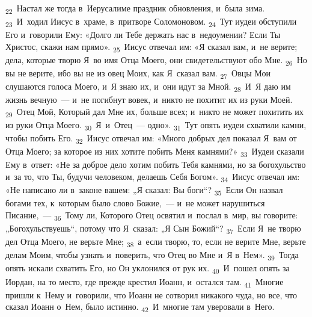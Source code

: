 \documentclass[a4paper,12pt]{article}
\begin{document}
\textsubscript{22}~Настал же тогда в~Иерусалиме праздник обновления, и~была зима. \textsubscript{23}~И~ходил Иисус в~храме, в~притворе Соломоновом. \textsubscript{24}~Тут иудеи обступили Его и~говорили Ему: «Долго ли Тебе держать нас в~недоумении? Если Ты Христос, скажи нам прямо». \textsubscript{25}~Иисус отвечал им: «Я сказал вам, и~не верите; дела, которые творю Я~во имя Отца Моего, они свидетельствуют обо Мне. \textsubscript{26}~Но вы не верите, ибо вы не из овец Моих, как Я~сказал вам. \textsubscript{27}~Овцы Мои слушаются голоса Моего, и~Я знаю их, и~они идут за Мной. \textsubscript{28}~И~Я даю им жизнь вечную~--- и~не погибнут вовек, и~никто не похитит их из руки Моей. \textsubscript{29}~Отец Мой, Который дал Мне их, больше всех; и~никто не может похитить их из руки Отца Моего. \textsubscript{30}~Я~и~Отец~--- одно». \textsubscript{31}~Тут опять иудеи схватили камни, чтобы побить Его. \textsubscript{32}~Иисус отвечал им: «Много добрых дел показал Я~вам от Отца Моего; за которое из них хотите побить Меня камнями?» \textsubscript{33}~Иудеи сказали Ему в~ответ: «Не за доброе дело хотим побить Тебя камнями, но за богохульство и~за то, что Ты, будучи человеком, делаешь Себя Богом». \textsubscript{34}~Иисус отвечал им: «Не написано ли в~законе вашем: „Я сказал: Вы боги“? \textsubscript{35}~Если Он назвал богами тех, к~которым было слово Божие,~--- и~не может нарушиться Писание,~--- \textsubscript{36}~Тому ли, Которого Отец освятил и~послал в~мир, вы говорите: „Богохульствуешь“, потому что Я~сказал: „Я Сын Божий“? \textsubscript{37}~Если Я~не творю дел Отца Моего, не верьте Мне; \textsubscript{38}~а~если творю, то, если не верите Мне, верьте делам Моим, чтобы узнать и~поверить, что Отец во Мне и~Я в~Нем». \textsubscript{39}~Тогда опять искали схватить Его, но Он уклонился от рук их. \textsubscript{40}~И~пошел опять за Иордан, на то место, где прежде крестил Иоанн, и~остался там. \textsubscript{41}~Многие пришли к~Нему и~говорили, что Иоанн не сотворил никакого чуда, но все, что сказал Иоанн о~Нем, было истинно. \textsubscript{42}~И~многие там уверовали в~Него. 
\end{document}
